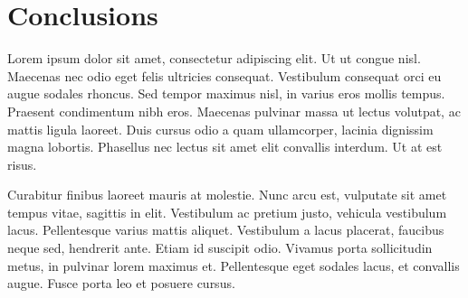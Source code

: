 \section{Conclusions}\label{conclusions}

Lorem ipsum dolor sit amet, consectetur adipiscing elit. Ut ut congue nisl. Maecenas nec odio eget felis ultricies consequat. Vestibulum consequat orci eu augue sodales rhoncus. Sed tempor maximus nisl, in varius eros mollis tempus. Praesent condimentum nibh eros. Maecenas pulvinar massa ut lectus volutpat, ac mattis ligula laoreet. Duis cursus odio a quam ullamcorper, lacinia dignissim magna lobortis. Phasellus nec lectus sit amet elit convallis interdum. Ut at est risus.

Curabitur finibus \citep{foobar} laoreet mauris at molestie. Nunc arcu est, vulputate sit amet tempus vitae, sagittis in elit. Vestibulum ac pretium justo, vehicula vestibulum lacus. Pellentesque varius mattis aliquet. Vestibulum a lacus placerat, faucibus neque sed, hendrerit ante. Etiam id suscipit odio. Vivamus porta sollicitudin metus, in pulvinar lorem maximus et. Pellentesque eget sodales lacus, et convallis augue. Fusce porta leo et posuere cursus.
